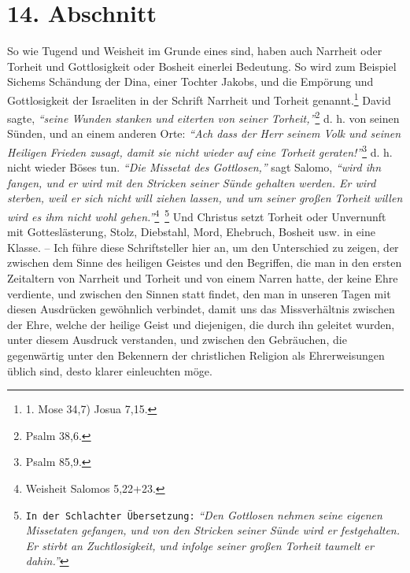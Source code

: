 \section{14. Abschnitt} \label{kap9_ab14}

So wie Tugend und Weisheit im Grunde eines sind, haben auch Narrheit oder
Torheit und Gottlosigkeit oder Bosheit einerlei Bedeutung. So wird zum Beispiel
Sichems Schändung der Dina, einer
Tochter Jakobs, und die Empörung und
Gottlosigkeit der Israeliten in der Schrift Narrheit
und Torheit
genannt.\footnote{1. Mose 34,7) Josua 7,15.}
David sagte,
\textit{"`seine Wunden stanken
und eiterten von seiner Torheit,"'}\footnote{Psalm 38,6.}
d. h. von seinen Sünden,
und an einem anderen Orte:
\textit{"`Ach dass der Herr seinem Volk und seinen Heiligen
Frieden zusagt, damit sie nicht wieder auf eine Torheit
geraten!"'}\footnote{Psalm 85,9.}
d. h. nicht wieder Böses tun.
\textit{"`Die Missetat des Gottlosen,"'}
sagt Salomo,
\textit{"`wird ihn fangen, und er wird mit den Stricken
seiner Sünde gehalten werden. Er wird sterben, weil er sich nicht
will ziehen lassen, und um seiner großen Torheit willen wird es ihm nicht wohl
gehen."'}\footnote{Weisheit Salomos 5,22+23.}~\footnote{\texttt{In der Schlachter
Übersetzung:} \textit{"`Den Gottlosen nehmen seine eigenen Missetaten gefangen,
und von den Stricken seiner Sünde wird er festgehalten. Er stirbt an
Zuchtlosigkeit, und infolge seiner großen Torheit taumelt er dahin."' }}
Und Christus setzt Torheit oder
Unvernunft mit Gotteslästerung, Stolz, Diebstahl, Mord, Ehebruch, Bosheit usw.
in eine Klasse. -- Ich führe diese Schriftsteller hier an, um den
Unterschied zu zeigen, der zwischen dem Sinne des heiligen Geistes und den
Begriffen, die man in den ersten Zeitaltern von Narrheit und Torheit und von
einem Narren hatte, der keine Ehre verdiente, und zwischen den Sinnen statt
findet, den man in unseren Tagen mit diesen Ausdrücken gewöhnlich verbindet,
damit uns das Missverhältnis zwischen der Ehre, welche der heilige Geist und
diejenigen, die durch ihn geleitet wurden, unter diesem Ausdruck verstanden,
und zwischen den Gebräuchen, die gegenwärtig unter den Bekennern der
christlichen Religion als Ehrerweisungen üblich sind, desto klarer einleuchten
möge.

